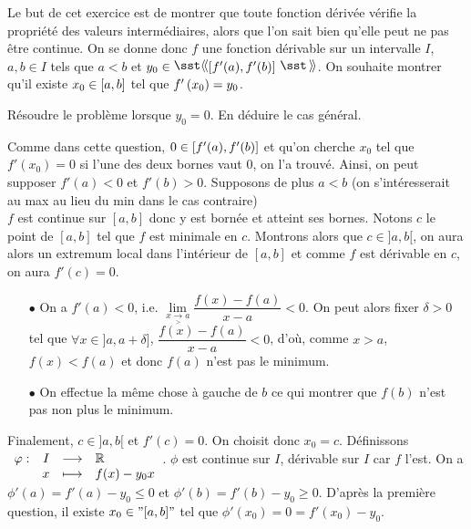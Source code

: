 \documentclass{magnolia}
\begin{document}

Le but de cet exercice est de montrer que toute fonction dérivée vérifie la
propriété des valeurs intermédiaires, alors que l'on sait bien qu'elle peut
ne pas être continue. On se donne donc $f$ une fonction dérivable sur un
intervalle $I$, $a,b\in I$ tels que $a< b$ et $y_0\in\intergf{f'(a)}{f'(b)}$. On souhaite
montrer qu'il existe $x_0\in\left[a,b\right]$ tel que $f'\left(x_0\right)=y_0$.
\begin{questions}
\question Résoudre le problème lorsque $y_0=0$.
\question En déduire le cas général.
\end{questions}

\begin{sol}
\begin{questions}
\question 
Comme dans cette question, $0\in \left[f'(a),f'(b)\right]$ et qu'on cherche $x_0$ tel que $f'(x_0)=0$  si l'une des deux bornes vaut $0$, on l'a trouvé. Ainsi, on peut supposer $f'(a)<0$ et $f'(b)>0$. Supposons de plus $a<b$ (on s'intéresserait au max au lieu du min dans le cas contraire)\\
$f$ est continue sur $[a,b]$ donc y est bornée et atteint ses bornes. Notons $c$ le point de $[a,b]$ tel que $f$ est minimale en $c$. Montrons alors que $c\in ]a,b[$, on aura alors un extremum local dans l'intérieur de $[a,b]$ et comme $f$ est dérivable en $c$, on aura $f'(c)=0$.\\
\begin{itemize}
\item[$\bullet$] On a $f'(a)<0$, i.e. $\underset{x\underset{>}{\to}a}{\lim}\dfrac{f(x)-f(a)}{x-a}<0$. On peut alors fixer $\delta>0$ tel que $\forall x \in ]a,a+\delta]$, $\dfrac{f(x)-f(a)}{x-a}<0$, d'où, comme $x>a$, $f(x)<f(a)$ et donc $f(a)$ n'est pas le minimum.
\item[$\bullet$] On effectue la même chose à gauche de $b$ ce qui montrer que $f(b)$ n'est pas non plus le minimum. 
\end{itemize}
Finalement, $c\in ]a,b[$ et $f'(c)=0$. On choisit donc $x_0=c$.
\question Définissons $\begin{array}[t]{lrcl} \displaystyle{\varphi} : & \displaystyle{I} & \longrightarrow & \displaystyle{\mathbb{R}} \\ & \displaystyle{x} & \longmapsto & \displaystyle{f(x)-y_0 x} \end{array}$. $\phi$ est continue sur $I$, dérivable sur $I$ car $f$ l'est. On a $\phi'(a)=f'(a)-y_0\leq 0$ et $\phi'(b)=f'(b)-y_0\geq 0$. D'après la première question, il existe $x_0 \in "[a,b]"$ tel que $\phi'(x_0)=0=f'(x_0)-y_0$.
\end{questions}

\end{sol}
\end{document}

